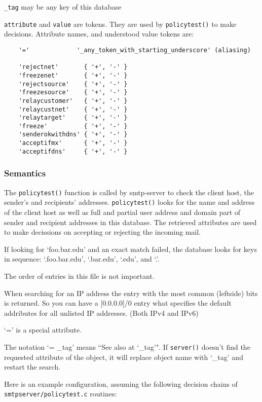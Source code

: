 {\tt \_tag} may be any key of this database

{\tt attribute} and {\tt value} are tokens. They are used by 
{\tt policytest()} to make decisions.  Attribute names, and understood 
value tokens are:

\begin{verbatim}
    '='             '_any_token_with_starting_underscore' (aliasing)

    'rejectnet'       { '+', '-' }
    'freezenet'       { '+', '-' }
    'rejectsource'    { '+', '-' }
    'freezesource'    { '+', '-' }
    'relaycustomer'   { '+', '-' }
    'relaycustnet'    { '+', '-' }
    'relaytarget'     { '+', '-' }
    'freeze'          { '+', '-' }
    'senderokwithdns' { '+', '-' }
    'acceptifmx'      { '+', '-' }
    'acceptifdns'     { '+', '-' }
\end{verbatim}


\subsubsection{Semantics}



The {\tt policytest()} function is called by smtp-server to check the client 
host, the sender's and recipients' addresses.  {\tt policytest()} looks for 
the name and address of the client host as well as full and partial user address 
and domain part of sender and recipient addresses in this database.  The 
retrieved attributes are used to make decissions on accepting or rejecting 
the incoming mail.

If looking for `foo.bar.edu' and an exact match failed, the database looks for 
keys in sequence:  `.foo.bar.edu', `.bar.edu', `.edu', and `.'.

The order of entries in this file is not important.

When searching for an IP address the entry with the most common (leftside) bits
is returned. So you can have a [0.0.0.0]/0 entry what specifies the 
default addributes for all unlisted IP addresses. (Both IPv4 and IPv6)

`=' is a special attribute.

The notation `= \_tag' means ``See also at `\_tag'". If {\tt server()} doesn't 
find the requested attribute of the object, it will replace object name 
with `\_tag' and restart the search.

Here is an example configuration, assuming the following decision 
chains of {\tt smtpserver/policytest.c} routines:

